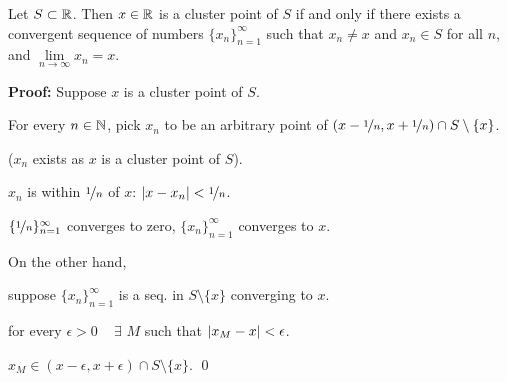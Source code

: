 \documentclass[10pt,aspectratio=169]{beamer}
\begin{document}
\begin{frame}

\begin{proposition}
Let $S \subset {\mathbb{R}}$.  Then $x \in {\mathbb{R}}$ is a cluster point of $S$
if and only if
there exists a convergent sequence of numbers $\{ x_n \}_{n=1}^\infty$ such that
$x_n \not= x$ and $x_n \in S$ for all $n$, and $\lim\limits_{n\to\infty} x_n = x$.
\end{proposition}

\pause
\textbf{Proof:}
Suppose $x$ is a cluster point of $S$.

\pause

For every $n \in {\mathbb{N}}$, pick $x_n$ to be an arbitrary point of
$(x-\nicefrac{1}{n},x+\nicefrac{1}{n}) \cap S \setminus \{x\}$.

($x_n$ exists as $x$ is a cluster point of $S$).

\pause

$x_n$ is within $\nicefrac{1}{n}$ of $x$: \quad
$\left\lvert {x-x_n} \right\rvert < \nicefrac{1}{n}$.


\pause

$\{ \nicefrac{1}{n} \}_{n=1}^\infty$ converges to zero,
$\{ x_n \}_{n=1}^\infty$ converges to $x$.

\pause
\medskip

On the other hand, 

suppose $\{ x_n \}_{n=1}^\infty$ is a seq. in $S \setminus \{ x \}$ converging to $x$.

\pause
\thus \quad
for every $\epsilon > 0$ ~ $\exists$ $M$ such that $\left\lvert {x_M - x} \right\rvert < \epsilon$.

\pause
\thus \quad $x_M \in (x-\epsilon,x+\epsilon) \cap S \setminus \{x\}$.
\qed

\end{frame}
\end{document}
